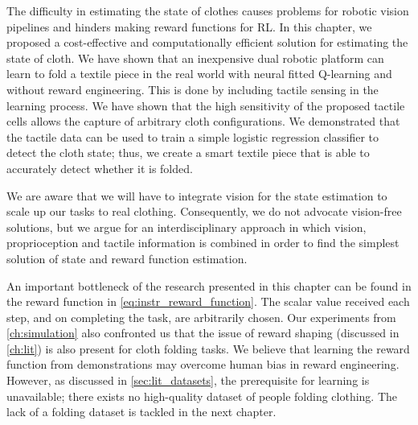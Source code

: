 \documentclass[\home/main.tex]{subfiles}
\begin{document}
The difficulty in estimating the state of clothes causes problems for robotic vision pipelines and hinders making reward functions for RL.
In this chapter, we proposed a cost-effective and computationally efficient solution for estimating the state of cloth. We have shown that an inexpensive dual robotic platform can learn to fold a textile piece in the real world with neural fitted Q-learning and without reward engineering. This is done by including tactile sensing in the learning process. We have shown that the high sensitivity of the proposed tactile cells allows the capture of arbitrary cloth configurations. We demonstrated that the tactile data can be used to train a simple logistic regression classifier to detect the cloth state; thus, we create a smart textile piece that is able to accurately detect whether it is folded.

We are aware that we will have to integrate vision for the state estimation to scale up our tasks to real clothing. Consequently, we do not advocate vision-free solutions, but we argue for an interdisciplinary approach in which vision, proprioception and tactile information is combined in order to find the simplest solution of state and reward function estimation.

An important bottleneck of the research presented in this chapter can be found in the reward function in \cref{eq:instr_reward_function}. The scalar value received each step, and on completing the task, are arbitrarily chosen. Our experiments from \cref{ch:simulation} also confronted us that the issue of reward shaping (discussed in \cref{ch:lit}) is also present for cloth folding tasks. We believe that learning the reward function from demonstrations may overcome human bias in reward engineering. However, as discussed in \cref{sec:lit_datasets}, the prerequisite for learning is unavailable; there exists no high-quality dataset of people folding clothing. The lack of a folding dataset is tackled in the next chapter.
\end{document}
